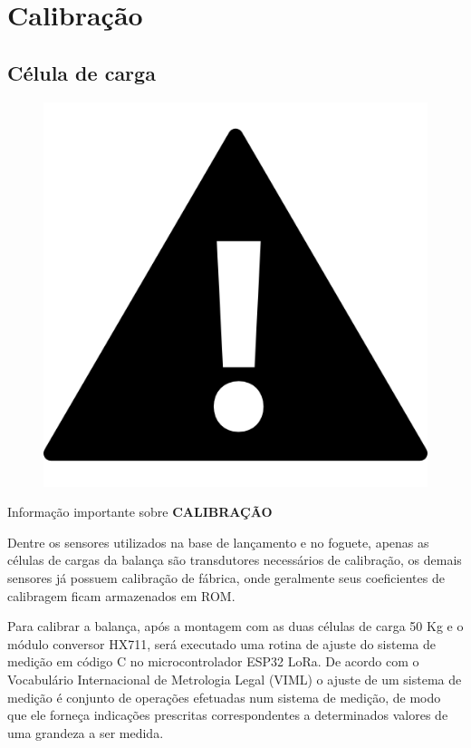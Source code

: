 \chapter{Calibração}

\section*{Célula de carga}
\begin{center}
    \begin{figure}[H]
    \centering
		\includegraphics[scale=1.6]{Figuras/bateria/iconeimportante.png}
	    \label{iconeimportante}
    \end{figure} 
  
    	Informação importante sobre \textbf{CALIBRAÇÃO}
 \end{center}  

\par Dentre os sensores utilizados na base de lançamento e no foguete, apenas as células de cargas da balança são transdutores necessários de calibração, os demais sensores já possuem calibração de fábrica, onde geralmente seus coeficientes de calibragem ficam armazenados em ROM.

\par Para calibrar a balança, após a montagem com as duas células de carga 50 Kg e o módulo conversor HX711, será executado uma rotina de ajuste do sistema de medição em código C no microcontrolador ESP32 LoRa. De acordo com o Vocabulário Internacional de Metrologia Legal (VIML) o ajuste de um sistema de medição é conjunto de operações efetuadas num sistema de medição, de modo que ele forneça indicações prescritas correspondentes a determinados valores de uma grandeza a ser medida. 

